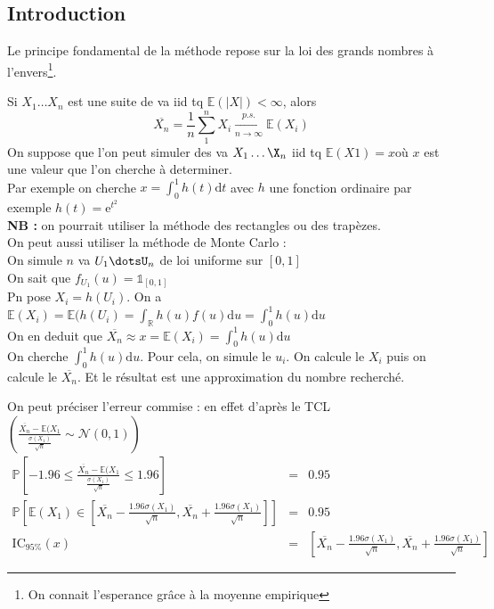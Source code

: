 \documentclass{report}
\begin{document}
\subsection{Introduction}
Le principe fondamental de la méthode repose sur la loi des grands nombres à l'envers\footnote{On connait l'esperance grâce à la moyenne empirique}.

Si $X_1\dots X_n$ est une suite de va iid tq $\mathbb{E}(|X|)< \infty$, alors \[\overline{X_n} = \displaystyle\frac{1}{n}\displaystyle\sum_1^nX_i\displaystyle\xrightarrow[n\to\infty]{\textit{p.s.}}\mathbb{E}(X_i)\]
On suppose que l'on peut simuler des va $X_1\dots\X_n$ iid tq $\mathbb{E}(X1) = x$où $x$ est une valeur que l'on cherche à determiner.\\
Par exemple on cherche $x= \int_0^1h(t)\mathrm{d}t$ avec $h$ une fonction ordinaire par exemple $h(t)=\mbox{e}^{t^2}$\\
\textbf{NB : } on pourrait utiliser la méthode des rectangles ou des trapèzes.\\

\vspace{0.3cm}
On peut aussi utiliser la méthode de Monte Carlo : \\
On simule $n$ va $U_1\dotsU_n$ de loi uniforme sur $[0,1]$\\
On sait que $f_{U_1}(u) = \mathbb{1}_{[0,1]}$\\
Pn pose $X_i = h(U_i)$. On a $\mathbb{E}(X_i) = \mathbb{E}(h(U_i) = \int_\mathbb{R}h(u)f(u)\mathrm{d}u=\int_0^1h(u)\mathrm{d}u$\\
On en deduit que $\overline{X_n}\approx x = \mathbb{E}(X_i)=\int_0^1h(u)\mathrm{d}u$\\
On cherche $\int^1_0h(u)\mathrm{d}u$. Pour cela, on simule le $u_i$. On calcule le $X_i$ puis on calcule le $\overline{X_n}$. Et le résultat est une approximation du nombre recherché.

\vspace{0.5cm}
On peut préciser l'erreur commise : en effet d'après le TCL $\left(\displaystyle\frac{\overline{X_n}-\mathbb{E}(X_1}{\displaystyle\frac{\sigma(X_1)}{\sqrt{n}}}\sim\mathcal{N}(0,1)\right)$
\begin{eqnarray}
\mathbb{P}\left[-1.96 \leq \displaystyle\frac{\overline{X_n}-\mathbb{E}(X_1}{\displaystyle\frac{\sigma(X_1)}{\sqrt{n}}} \leq 1.96\right]&=&0.95\nonumber\\
\mathbb{P}\left[\mathbb{E}(X_1)\in \left[\overline{X_n}-\displaystyle\frac{1.96\sigma(X_1)}{\sqrt{n}},\overline{X_n}+\displaystyle\frac{1.96\sigma(X_1)}{\sqrt{n}} \right]\right]&=&0.95\nonumber\\
\mbox{IC}_{95\%}(x) &=& \left[\overline{X_n}-\displaystyle\frac{1.96\sigma(X_1)}{\sqrt{n}},\overline{X_n}+\displaystyle\frac{1.96\sigma(X_1)}{\sqrt{n}} \right]\nonumber
\end{eqnarray}
\end{document}
